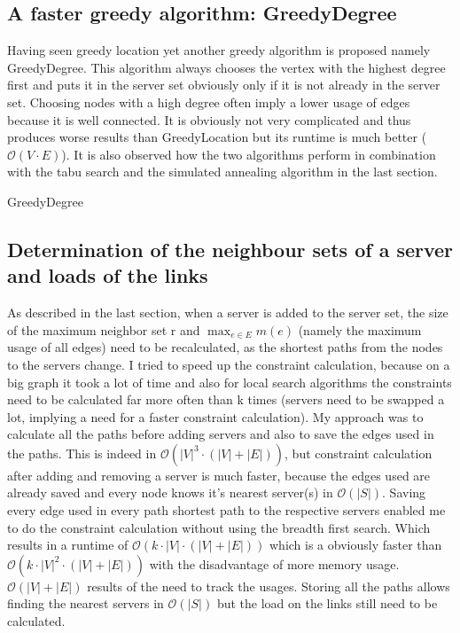 \documentclass [12pt]{article}
\begin{document}
\subsection{A faster greedy algorithm: GreedyDegree}
Having seen greedy location yet another greedy algorithm is proposed namely GreedyDegree. This algorithm always chooses the vertex with the
highest degree first and puts it in the server set obviously only if it is not already in the server set. 
Choosing nodes with a high degree often imply a lower usage of edges because it is well connected. It is obviously not very complicated 
and thus produces worse results than GreedyLocation but its runtime is much better ($\mathcal O(V \cdot E)$). It is also observed how 
the two algorithms perform in combination with the tabu search and the simulated annealing algorithm in the last section. 
\begin{algorithm}[H]
  \caption{GreedyDegree}
  \label{greedydeg}
\end{algorithm}

\subsection{Determination of the neighbour sets of a server and loads of the links}
As described in the last section, when a server is added to the server set, the size of the maximum neighbor set r and
$\max_{e \in E}m(e)$ (namely the maximum usage of all edges) need to be recalculated, as the shortest paths from the nodes 
to the servers change. I tried to speed up the constraint calculation, 
because on a big graph it took a lot of time and also for local search algorithms the constraints need to be calculated
far more often than k times (servers need to be swapped a lot, implying a need for a faster constraint calculation).
My approach was to calculate all the paths before adding servers and also to save the edges used in the paths.
This is indeed in $\mathcal O(|V|^{3} \cdot (|V|+|E|))$, but constraint calculation after adding and removing a server is much faster,
because the edges used are already saved and every node knows it's nearest server(s) in $\mathcal O(|S|)$. Saving 
every edge used in every path shortest path to the respective servers enabled me to do the constraint calculation without using the breadth first search.
Which results in a runtime of $\mathcal O(k \cdot |V| \cdot (|V|+|E|))$ which is a obviously faster than $\mathcal O(k \cdot |V|^{2} \cdot (|V|+|E|))$ with the disadvantage of more memory usage.
$\mathcal O(|V|+|E|)$ results of the need to track the usages. Storing all the paths allows finding the nearest servers in $\mathcal O(|S|)$ but the load on the links 
still need to be calculated.
\end{document}

